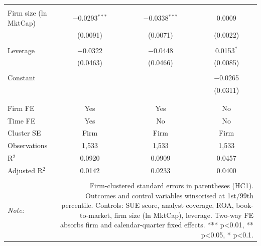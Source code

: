 \begin{table}[!htbp]
\begin{tabular}{@{\extracolsep{5pt}}lccc}
  & & & \\ 
 Firm size (ln MktCap) & $-$0.0293$^{***}$ & $-$0.0338$^{***}$ & 0.0009 \\ 
  & (0.0091) & (0.0071) & (0.0022) \\ 
  & & & \\ 
 Leverage & $-$0.0322 & $-$0.0448 & 0.0153$^{*}$ \\ 
  & (0.0463) & (0.0466) & (0.0085) \\ 
  & & & \\ 
 Constant &  &  & $-$0.0265 \\ 
  &  &  & (0.0311) \\ 
  & & & \\ 
\hline \\[-1.8ex] 
Firm FE & Yes & Yes & No \\ 
Time FE & Yes & No & No \\ 
Cluster SE & Firm & Firm & Firm \\ 
Observations & 1,533 & 1,533 & 1,533 \\ 
R$^{2}$ & 0.0920 & 0.0909 & 0.0457 \\ 
Adjusted R$^{2}$ & 0.0142 & 0.0233 & 0.0400 \\ 
\hline 
\hline \\[-1.8ex] 
\textit{Note:}  & \multicolumn{3}{r}{Firm-clustered standard errors in parentheses (HC1). Outcomes and control variables winsorised at 1st/99th percentile. Controls: SUE score, analyst coverage, ROA, book-to-market, firm size (ln MktCap), leverage. Two-way FE absorbs firm and calendar-quarter fixed effects. *** p<0.01, ** p<0.05, * p<0.1.} \\ 
\end{tabular} 
\end{table} 
